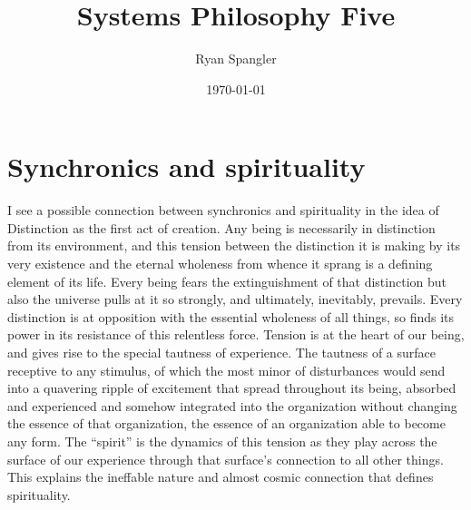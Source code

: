 \documentclass[12pt]{scrartcl}
\title{Systems Philosophy Five}
\author{Ryan Spangler}
\date{\today}
\begin{document}
\maketitle

\section{Synchronics and spirituality}

I see a possible connection between synchronics and spirituality in the idea of Distinction as the first act of creation.  Any being is necessarily in distinction from its environment, and this tension between the distinction it is making by its very existence and the eternal wholeness from whence it sprang is a defining element of its life.  Every being fears the extinguishment of that distinction but also the universe pulls at it so strongly, and ultimately, inevitably, prevails.  Every distinction is at opposition with the essential wholeness of all things, so finds its power in its resistance of this relentless force.  Tension is at the heart of our being, and gives rise to the special tautness of experience.  The tautness of a surface receptive to any stimulus, of which the most minor of disturbances would send into a quavering ripple of excitement that spread throughout its being, absorbed and experienced and somehow integrated into the organization without changing the essence of that organization, the essence of an organization able to become any form.  The ``spirit'' is the dynamics of this tension as they play across the surface of our experience through that surface's connection to all other things.  This explains the ineffable nature and almost cosmic connection that defines spirituality.  
\end{document}
